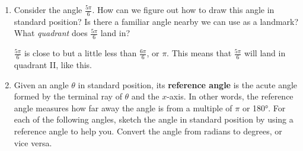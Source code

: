 \documentclass[main]{subfiles}
\begin{document}
\begin{enumerate}[resume]

\item 
\begin{problem}
Consider the angle $\frac{5\pi}{6}$. How can we figure out how to draw this angle in standard position? Is there a familiar angle nearby we can use as a landmark? What \emph{quadrant} does $\frac{5\pi}{6}$ land in?
\end{problem}
\pspace{\vfill}

\begin{solution}
    $\frac{5\pi}{6}$ is close to but a little less than $\frac{6\pi}{6}$, or $\pi$. This means that $\frac{5\pi}{6}$ will land in quadrant II, like this.
    \begin{center}
\end{center}
\end{solution}

\item   \label{2-1-ref-angles}


Given an angle $\theta$ in standard position, its \textbf{reference angle} is the acute angle formed by the terminal ray of $\theta$ and the $x$-axis. In other words, the reference angle measures how far away the angle is from a multiple of $\pi$ or \ang{180}.
For each of the following angles, sketch the angle in standard position by using a reference angle to help you. Convert the angle from radians to degrees, or vice versa.


\end{enumerate}
\end{document}
